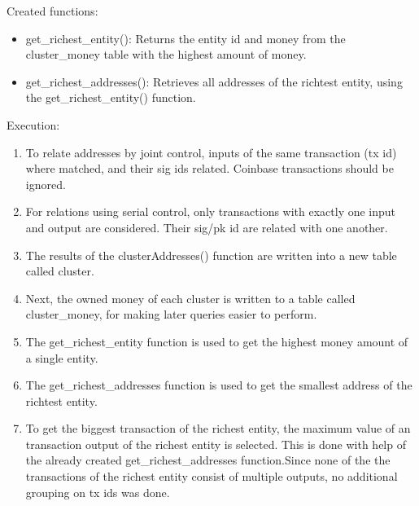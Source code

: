 \documentclass[12pt,a4paper]{article}
\begin{document}
Created functions:
\begin{itemize}
  \item get\_richest\_entity(): Returns the entity id and money from the cluster\_money table with the highest amount of money.
  \item get\_richest\_addresses(): Retrieves all addresses of the richtest entity, using the get\_richest\_entity() function.
\end{itemize}
Execution:
\begin{enumerate}
\item To relate addresses by joint control, inputs of the same transaction (tx id) where matched, and their sig ids related. Coinbase transactions should be ignored.
\item For relations using serial control, only transactions with exactly one input and output are considered. Their sig/pk id are related with one another.
\item The results of the clusterAddresses() function are written into a new table called cluster.
\item Next, the owned money of each cluster is written to a table called cluster\_money, for making later queries easier to perform.
\item The get\_richest\_entity function is used to get the highest money amount of a single entity.
\item The get\_richest\_addresses function is used to get the smallest address of the richtest entity.
\item To get the biggest transaction of the richest entity, the maximum value of an transaction output of the richest entity is selected.
This is done with help of the already created get\_richest\_addresses function.Since
none of the the transactions of the richest entity consist of multiple outputs, no additional grouping on tx ids was done.
\end{enumerate}
\end{document}

